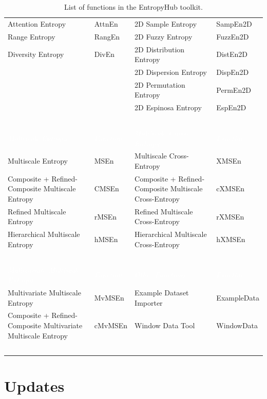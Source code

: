 \documentclass[12pt, a4paper, titlepage, openany]{book}
\begin{document}
\begin{center}
\begin{table}[!ht]
\begin{tabular}{|p{50mm}|p{20mm}|p{63mm}|p{25mm}|}
Attention Entropy		&   AttnEn 		 	&	2D Sample Entropy 	&	SampEn2D \\
Range Entropy			&   RangEn 		 	&   2D Fuzzy Entropy	&	FuzzEn2D \\
Diversity Entropy		&   DivEn 	    	&  2D Distribution Entropy 	&	DistEn2D \\
\						&	\			    &  2D Dispersion Entropy 	&	DispEn2D \\ 	 
\						&	\	 		    &  2D Permutation Entropy	&	PermEn2D \\
\						&	\	            &  2D Espinosa Entropy		&	EspEn2D \\
\					    &	\			    &	\	&	\\ 	 
\rowcolor{ehone} \emph{\textcolor{white}{Multiscale Entropy}} &	\emph{\textcolor{white}{Function}}	&  \emph{\textcolor{white}{Multiscale Cross-Entropy}}		&	\emph{\textcolor{white}{Function}} \\
Multiscale Entropy		&	MSEn			&	Multiscale Cross-Entropy	&	XMSEn \\
Composite + Refined-Composite Multiscale Entropy & 	CMSEn		&	Composite + Refined-Composite Multiscale Cross-Entropy	& cXMSEn \\
Refined Multiscale Entropy	& rMSEn			&	Refined Multiscale Cross-Entropy	&	rXMSEn  \\
Hierarchical Multiscale Entropy	&	hMSEn	&	Hierarchical Multiscale Cross-Entropy &	hXMSEn \\
\						&	\				&		\						&	\\ 	 	 
\rowcolor{ehone} \emph{\textcolor{white}{Multivariate Multiscale Entropy}} &	 \emph{\textcolor{white}{Function}}	&  \emph{\textcolor{white}{Other Functions}} &	 \emph{\textcolor{white}{Function}} \\
Multivariate Multiscale Entropy		&	MvMSEn	& Example Dataset Importer & ExampleData \\
Composite + Refined-Composite Multivariate Multiscale Entropy		&	cMvMSEn	& Window Data Tool & WindowData \\
\						&	\				&		\						&	\\ 	 	 
\hline
\end{tabular}

\caption{List of functions in the EntropyHub toolkit.}
\label{table: tab_1}
\end{table}
\end{center}

\newpage
\section{\textbf{Updates}}
\end{document}
